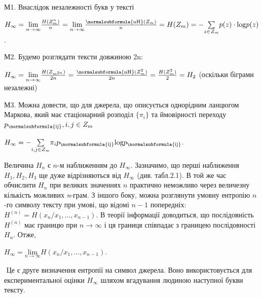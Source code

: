 М1. Внаслідок незалежності букв у тексті

{\centering
 ${H_{{\infty }}=\underset{{n\rightarrow \infty
}}{{\text{lim}}}\frac{H(Z_{{m}}^{{n}})}{n}=\underset{{n\rightarrow \infty
}}{{\text{lim}}}\frac{\normalsubformula{\text{nH}}(Z_{{m}})}{n}=H(Z_{{m}})=-\underset{{z\in
Z_{{m}}}}{\sum }{p(z)\cdot \text{log}p(z)}}$.
\par}

М2. Будемо розглядати тексти довжиною 2n:

 ${H_{{\infty }}=\underset{{n\rightarrow \infty
}}{{\text{lim}}}\frac{H(Z_{{m}^{{2n}}})}{2n}=\frac{\normalsubformula{\text{nH}}(Z_{{m}}^{{2}})}{2n}=\frac{H(Z_{{m}}^{{2}})}{2}=H_{{2}}}$
(оскільки біграми незалежні)

М3. Можна довести, що для джерела, що описується однорідним ланцюгом Маркова,
який має стаціонарний розподіл  ${\{\pi _{{i}}\}}$ та ймовірності переходу 
${p_{{\normalsubformula{\text{ij}}}},i,j\in Z_{{m}}}$

{\centering
 ${H_{{\infty }}=-\underset{{i,j\in Z_{{m}}}}{\sum }{\pi
_{{i}}p_{{\normalsubformula{\text{ij}}}}\text{log}p_{{\normalsubformula{\text{ij}}}}}}$.
\par}

Величина  ${H_{{n}}}$ є  ${n}${}-м наближенням до  ${H_{{\infty }}}$. Зазначимо,
що перші наближення  ${H_{{1}},H_{{2}},H_{{3}}}$ ще дуже відрізняються від 
${H_{{\infty }}}$ (див. табл.2.1). В той же час обчислити  ${H_{{n}}}$ при
великих значеннях  ${n}$ практично неможливо  через величезну кількість
можливих \textit{n}{}-грам. З іншого боку, можна розглянути умовну ентропію 
${n}${}-го символу тексту при умові, що відомі  ${n-1}$ попередніх: 
${H^{{(n)}}=H(x_{{n}}/x_{{1}},\dots,x_{{n-1}})}$. В теорії
інформації доводиться, що послідовність  ${H^{{(n)}}}$ має границю при 
${n\rightarrow \infty }$ і ця границя співпадає з границею послідовності 
${H_{{n}}}$. Отже,

{\centering
 ${H_{{\infty }}=\underset{{n\rightarrow \infty
}}{{{\text{lim}}}}H(x_{{n}}/x_{{1}},\dots,x_{{n-1}})}$.
\par}

 $ $ Це є друге визначення ентропії на символ джерела. Воно використовується для
експериментальної оцінки  ${H_{{\infty }}}$ шляхом вгадування людиною наступної
букви тексту. 


\bigskip

